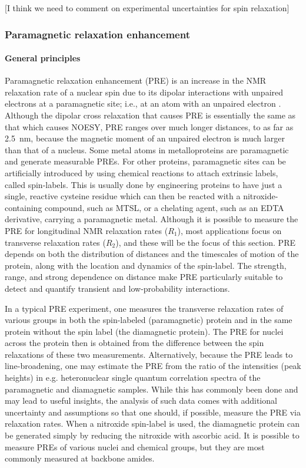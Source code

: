 \documentclass[9pt,review]{livecoms}
\begin{document}
[I think we need to comment on experimental uncertainties for spin relaxation]

\subsubsection{Paramagnetic relaxation enhancement}
\label{sub2:pre}

\paragraph{General principles}

Paramagnetic relaxation enhancement (PRE) is an increase in the NMR relaxation rate of a nuclear spin due to its dipolar interactions with unpaired electrons at a paramagnetic site; i.e., at an atom with an unpaired electron \cite{clore_elucidating_2007}.
Although the dipolar cross relaxation that causes PRE is essentially the same as that which causes NOESY, PRE ranges over much longer distances, to as far as \qty{2.5}{\nano\meter}, because the magnetic moment of an unpaired electron is much larger than that of a nucleus.
Some metal atoms in metalloproteins are paramagnetic and generate measurable PREs.
For other proteins, paramagnetic sites can be artificially introduced by using chemical reactions to attach extrinsic labels, called spin-labels.
This is usually done by engineering proteins to have just a single, reactive cysteine residue which can then be reacted with a nitroxide-containing compound, such as MTSL, or a chelating agent, such as an EDTA derivative, carrying a paramagnetic metal.
Although it is possible to measure the PRE for longitudinal NMR relaxation rates ($R_1$), most applications focus on transverse relaxation rates ($R_2$), and these will be the focus of this section.
PRE depends on both the distribution of distances and the timescales of motion of the protein, along with the location and dynamics of the spin-label.
The strength, range, and strong dependence on distance make PRE particularly suitable to detect and quantify transient and low-probability interactions.

In a typical PRE experiment, one measures the transverse relaxation rates of various groups in both the spin-labeled (paramagnetic) protein and in the same protein without the spin label (the diamagnetic protein).
The PRE for nuclei across the protein then is obtained from the difference between the spin relaxations of these two measurements.
Alternatively, because the PRE leads to line-broadening, one may estimate the PRE from the ratio of the intensities (peak heights) in e.g. heteronuclear single quantum correlation spectra of the paramagnetic and diamagnetic samples.
While this has commonly been done and may lead to useful insights, the analysis of such data comes with additional uncertainty and assumptions so that one should, if possible, measure the PRE via relaxation rates.
When a nitroxide spin-label is used, the diamagnetic protein can be generated simply by reducing the nitroxide with ascorbic acid.
It is possible to measure PREs of various nuclei and chemical groups, but they are most commonly measured at backbone amides.
\end{document}
